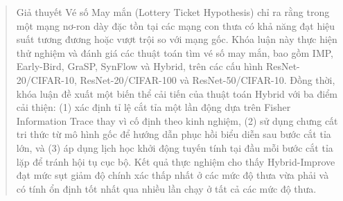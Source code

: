 \documentclass[
    fontsize=13pt,
    paper=a4,
    oneside,
    DIV=calc,
    chapterprefix=true
]{scrbook}
\renewcommand{\footrulewidth}{0.4pt}
\begin{document}
\begin{abstract}
    Giả thuyết Vé số May mắn (Lottery Ticket Hypothesis) chỉ ra rằng trong một mạng nơ-ron dày 
    đặc tồn tại các mạng con thưa có khả năng đạt hiệu suất tương đương hoặc vượt trội so với 
    mạng gốc. Khóa luận này thực hiện thử nghiệm và đánh giá các thuật toán 
    tìm vé số may mắn, bao gồm IMP, Early-Bird, GraSP, SynFlow và Hybrid, trên các cấu hình 
    ResNet-20/CIFAR-10, ResNet-20/CIFAR-100 và ResNet-50/CIFAR-10. Đồng thời, khóa luận đề xuất 
    một biến thể cải tiến của thuật toán Hybrid với ba điểm cải thiện: (1) xác định tỉ lệ cắt 
    tỉa một lần động dựa trên Fisher Information Trace thay vì cố định theo kinh nghiệm, (2) sử 
    dụng chưng cất tri thức từ mô hình gốc để hướng dẫn phục hồi biểu diễn sau bước cắt tỉa lớn, 
    và (3) áp dụng lịch học khởi động tuyến tính tại đầu mỗi bước cắt tỉa lặp để tránh hội tụ cục bộ. Kết 
    quả thực nghiệm cho thấy Hybrid-Improve đạt mức sụt giảm độ chính xác thấp nhất ở các mức độ thưa
    vừa phải và có tính ổn định tốt nhất qua nhiều lần chạy ở tất cả các mức độ thưa.
\end{abstract}
 

\tableofcontents
\listoffigures
\listofalgorithms
\printglossary[type=\acronymtype, title=Danh sách từ viết tắt]
\printglossary[title=Danh sách thuật ngữ]

\mainmatter

% 


% 



 
\end{document}
